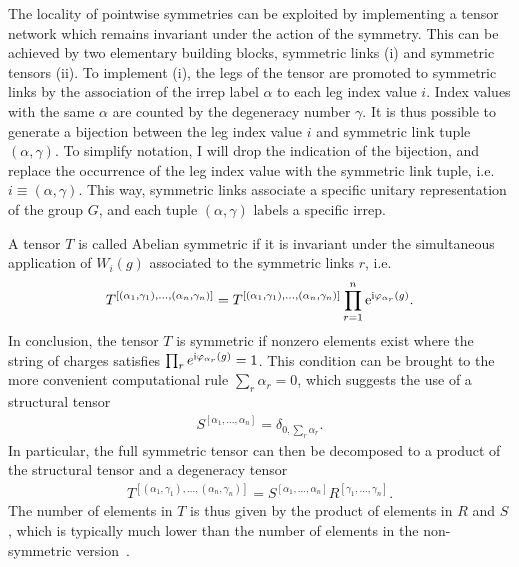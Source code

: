 The locality of pointwise symmetries can be exploited by implementing a tensor network which remains invariant under the action of the symmetry.
This can be achieved by two elementary building blocks, symmetric links (i) and symmetric tensors (ii).
To implement (i), the legs of the tensor are promoted to symmetric links by the association of the irrep label $\alpha$ to each leg index value $i$.
Index values with the same $\alpha$ are counted by the degeneracy number $\gamma$.
It is thus possible to generate a bijection between the leg index value $i$ and symmetric link tuple $(\alpha,\gamma)$.
To simplify notation, I will drop the indication of the bijection, and replace the occurrence of the leg index value with the symmetric link tuple, i.e. $i\equiv(\alpha,\gamma)$.
This way, symmetric links associate a specific unitary representation of the group $G$, and each tuple $(\alpha,\gamma)$ labels a specific irrep.

A tensor $T$ is called Abelian symmetric if it is invariant under the simultaneous application of $W_i(g)$ associated to the symmetric links $r$, i.e.
\begin{align}
    T^{[(\alpha_1,\gamma_1),\dots,(\alpha_n,\gamma_n)]} = T^{[(\alpha_1,\gamma_1),\dots,(\alpha_n,\gamma_n)]}\prod_{r=1}^n{\mathrm e^{\mathrm i \varphi_{\alpha_r}(g)}}.
    \label{eq:symmetric_tensor}
\end{align}
In conclusion, the tensor $T$ is symmetric if nonzero elements exist where the string of charges satisfies $\prod_r {e^{\mathrm i\varphi_{\alpha_r}(g)}} = 1$.
This condition can be brought to the more convenient computational rule $\sum_r\alpha_r = 0$, which suggests the use of a structural tensor~\cite{Silvi2019}
\begin{align}
    S^{[\alpha_1,\dots,\alpha_n]} = \delta_{0,\sum_r\alpha_r}.
\end{align}
In particular, the full symmetric tensor can then be decomposed to a product of the structural tensor and a degeneracy tensor
\begin{align}
    T^{[(\alpha_1,\gamma_1),\dots,(\alpha_n,\gamma_n)]} = S^{[\alpha_1,\dots,\alpha_n]} R^{[\gamma_1,\dots,\gamma_n]}.
\end{align}
The number of elements in $T$ is thus given by the product of elements in $R$ and $S$, which is typically much lower than the number of elements in the non-symmetric version~\cite{Silvi2019}.

